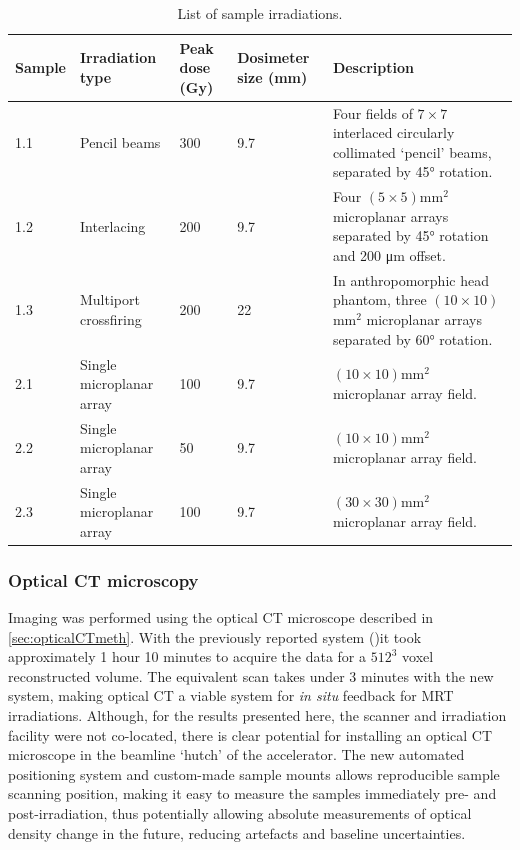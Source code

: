 	\begin{table}[H]
		\centering
		\begin{tabular}{ p{1.4cm} | p{3cm} |p{1cm} | p{2cm} |p{6.5cm}  }
			\textbf{Sample} & \textbf{Irradiation type} &\textbf{Peak dose (Gy)}   &\textbf{Dosimeter size (mm)} & \textbf{Description} \\ \hline
			1.1  & Pencil beams & 300  & 9.7 & Four fields of $7\times 7$ interlaced circularly collimated `pencil' beams, separated by  \ang{45} rotation. \\ \hline
			1.2  & Interlacing & 200  & 9.7 & Four $(5\times 5)$mm$^2$ microplanar arrays separated by \ang{45} rotation and 200 \si{\um} offset. \\ \hline
			1.3  & Multiport crossfiring & 200  & 22 & In anthropomorphic head phantom, three $(10\times 10)$mm$^2$ microplanar arrays separated by \ang{60} rotation. \\ \hline
			2.1  & Single microplanar array & 100  & 9.7 & $(10\times 10)$mm$^2$ microplanar array field. \\ \hline
			2.2  & Single microplanar array & 50  & 9.7 & $(10\times 10)$mm$^2$ microplanar array field. \\ \hline
			2.3  & Single microplanar array & 100  & 9.7 & $(30\times 30)$mm$^2$ microplanar array field. \\ %
		\end{tabular}
		\caption{List of sample irradiations.}
		\label{table:samples}
	\end{table}
	
	
	\subsubsection{Optical CT microscopy}
	Imaging was performed using the optical CT microscope described in \ref{sec:opticalCTmeth}. With the previously reported system (\cite{doranestablishing2013})it took approximately 1 hour 10 minutes to acquire the data for a $512^3$ voxel reconstructed volume. The equivalent scan takes under 3 minutes with the new system, making optical CT a viable system for \emph{in situ} feedback for MRT irradiations. Although, for the results presented here, the scanner and irradiation facility were not co-located, there is clear potential for installing an optical CT microscope in the beamline `hutch' of the accelerator. The new automated positioning system and custom-made sample mounts allows reproducible sample scanning position, making it easy to measure the samples immediately pre- and post-irradiation, thus potentially allowing absolute measurements of optical density change in the future, reducing artefacts and baseline uncertainties. 

